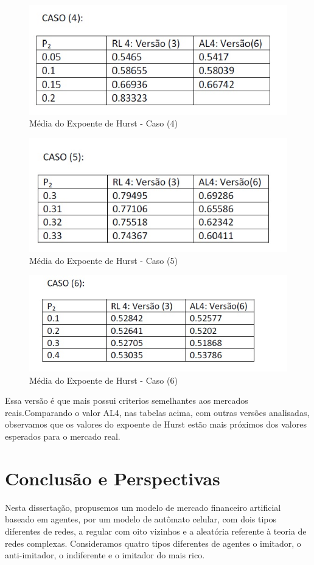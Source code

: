 \documentclass[brazil,ruledheader]{abnt}
\begin{document}
\begin{figure}[!h]
\centering
\includegraphics[width=.6\linewidth]{Figuras/tabela4.jpg}
\caption{Média do Expoente de Hurst - Caso (4)}
\label{fig:tabela4}
\end{figure}

\begin{figure}[!h]
\centering
\includegraphics[width=.6\linewidth]{Figuras/tabela5.jpg}
\caption{Média do Expoente de Hurst - Caso (5)}
\label{fig:tabela5}
\end{figure}

\begin{figure}[!h]
\centering
\includegraphics[width=.6\linewidth]{Figuras/tabela6.jpg}
\caption{Média do Expoente de Hurst - Caso (6)}
\label{fig:tabela6}
\end{figure}

Essa versão é que mais possui criterios semelhantes aos mercados
reais.Comparando o valor AL4, nas tabelas acima, com outras versões analisadas,
observamos que os valores do
expoente de Hurst estão mais próximos dos valores esperados para o mercado
real.  

\chapter{Conclusão e Perspectivas }\label{conclusao-perspectivas}

Nesta dissertação, propusemos um modelo de mercado financeiro artificial baseado
em agentes, por um modelo de autômato celular, com dois tipos diferentes de
redes, a regular com oito vizinhos e a aleatória referente à teoria de redes
complexas. Consideramos quatro tipos diferentes de agentes o imitador, o
anti-imitador, o indiferente e o imitador do mais rico. 
\end{document}
